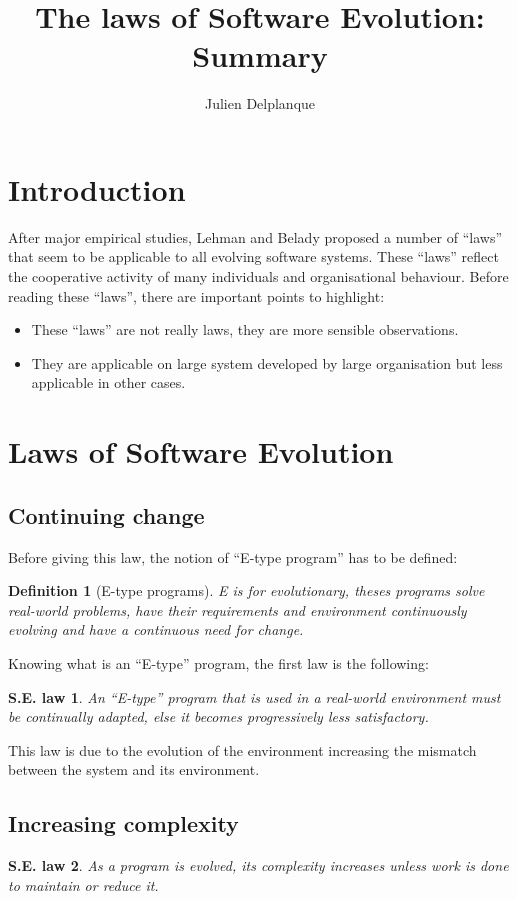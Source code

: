 \documentclass[a4paper,11pt]{report}
\title{The laws of Software Evolution: Summary}
\author{Julien Delplanque}
\newtheorem{definition}{Definition}
\newtheorem{law}{S.E. law}
\begin{document}
\maketitle
\newpage

\section{Introduction}
After major empirical studies, Lehman and Belady proposed a number of ``laws''
that seem to be applicable to all evolving software systems. These ``laws''
reflect the cooperative activity of many individuals and organisational
behaviour. Before reading these ``laws'', there are important points to
highlight:
\begin{itemize}
\item These ``laws'' are not really laws, they are more sensible observations.
\item They are applicable on large system developed by large organisation but
less applicable in other cases.
\end{itemize}

\section{Laws of Software Evolution}
\subsection{Continuing change}
Before giving this law, the notion of ``E-type program'' has to be defined:

\begin{definition}[E-type programs]
E is for evolutionary, theses programs solve
real-world problems, have their requirements and environment continuously
evolving and have a continuous need for change.
\end{definition}

Knowing what is an ``E-type'' program, the first law is the following:

\begin{law}
An ``E-type'' program that is used in a real-world environment must be
continually adapted, else it becomes progressively less satisfactory.
\end{law}

This law is due to the evolution of the environment increasing the mismatch
between the system and its environment.

\subsection{Increasing complexity}
\begin{law}
As a program is evolved, its complexity increases unless work is done to
maintain or reduce it.
\end{law}
\end{document}
